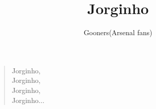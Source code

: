 \documentclass[a4paper,12pt]{article}
\title{Jorginho}
\author{Gooners(Arsenal fans)}
\date{}
\begin{document}
	
	\maketitle
	
	\begin{verse}
		
		Jorginho, \\
		Jorginho, \\
		Jorginho, \\
		Jorginho$\ldots$
		
	\end{verse}
	
\end{document}
